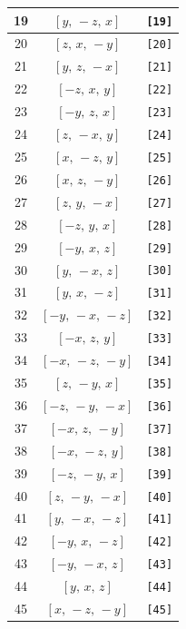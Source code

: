 \documentclass[fleqn,8pt]{jsarticle}
\begin{document}
\begin{longtable}{ccc}
19 & $\left[ y,\, - z,\, x \right]$ & {\tt [19]} \\ \hline
20 & $\left[ z,\, x,\, - y \right]$ & {\tt [20]} \\ \hline
21 & $\left[ y,\, z,\, - x \right]$ & {\tt [21]} \\ \hline
22 & $\left[ - z,\, x,\, y \right]$ & {\tt [22]} \\ \hline
23 & $\left[ - y,\, z,\, x \right]$ & {\tt [23]} \\ \hline
24 & $\left[ z,\, - x,\, y \right]$ & {\tt [24]} \\ \hline
25 & $\left[ x,\, - z,\, y \right]$ & {\tt [25]} \\ \hline
26 & $\left[ x,\, z,\, - y \right]$ & {\tt [26]} \\ \hline
27 & $\left[ z,\, y,\, - x \right]$ & {\tt [27]} \\ \hline
28 & $\left[ - z,\, y,\, x \right]$ & {\tt [28]} \\ \hline
29 & $\left[ - y,\, x,\, z \right]$ & {\tt [29]} \\ \hline
30 & $\left[ y,\, - x,\, z \right]$ & {\tt [30]} \\ \hline
31 & $\left[ y,\, x,\, - z \right]$ & {\tt [31]} \\ \hline
32 & $\left[ - y,\, - x,\, - z \right]$ & {\tt [32]} \\ \hline
33 & $\left[ - x,\, z,\, y \right]$ & {\tt [33]} \\ \hline
34 & $\left[ - x,\, - z,\, - y \right]$ & {\tt [34]} \\ \hline
35 & $\left[ z,\, - y,\, x \right]$ & {\tt [35]} \\ \hline
36 & $\left[ - z,\, - y,\, - x \right]$ & {\tt [36]} \\ \hline
37 & $\left[ - x,\, z,\, - y \right]$ & {\tt [37]} \\ \hline
38 & $\left[ - x,\, - z,\, y \right]$ & {\tt [38]} \\ \hline
39 & $\left[ - z,\, - y,\, x \right]$ & {\tt [39]} \\ \hline
40 & $\left[ z,\, - y,\, - x \right]$ & {\tt [40]} \\ \hline
41 & $\left[ y,\, - x,\, - z \right]$ & {\tt [41]} \\ \hline
42 & $\left[ - y,\, x,\, - z \right]$ & {\tt [42]} \\ \hline
43 & $\left[ - y,\, - x,\, z \right]$ & {\tt [43]} \\ \hline
44 & $\left[ y,\, x,\, z \right]$ & {\tt [44]} \\ \hline
45 & $\left[ x,\, - z,\, - y \right]$ & {\tt [45]} \\ \hline

\end{longtable}
\end{document}

